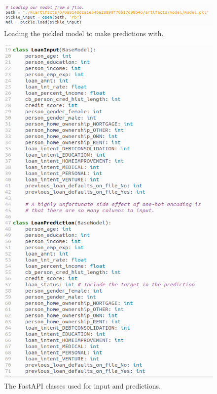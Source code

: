 \documentclass[12pt]{report}
\begin{document}
\begin{figure}[H]
    \centering
    \includegraphics[width=\linewidth]{Implementation/FastAPI+Uvi/LoadModel.png}
    \caption{Loading the pickled model to make predictions with.}
    \label{fig:UviLoadModel}
\end{figure}

\begin{figure}[H]
    \centering
    \includegraphics[width=.8\linewidth]{Implementation/FastAPI+Uvi/InputAndPrediction.png}
    \caption{The FastAPI classes used for input and predictions.}
    \label{fig:UviClasses}
\end{figure}
\end{document}
